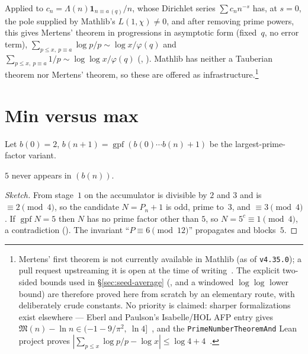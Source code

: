 \documentclass[10pt,a4paper]{article}
\newcommand{\gpf}{\operatorname{gpf}}
\begin{document}
Applied to $c_n=\Lambda(n)\mathbf 1_{n\equiv a\,(q)}/n$, whose Dirichlet series
$\sum c_n n^{-s}$ has, at $s=0$, the pole supplied by Mathlib's
$L(1,\chi)\ne0$, and after removing prime powers, this gives Mertens'
theorem in progressions in asymptotic form (fixed~$q$, no error term),
$\sum_{p\le x,\ p\equiv a}\log p/p\sim\log x/\varphi(q)$ and
$\sum_{p\le x,\ p\equiv a}1/p\sim\log\log x/\varphi(q)$
(,
).  Mathlib has
neither a Tauberian theorem nor Mertens' theorem, so these are offered as
infrastructure.\footnote{Mertens' first theorem is not currently available
in Mathlib (as of \texttt{v4.35.0}); a pull request upstreaming it is open
at the time of writing~\cite{Mathlib41394}.  The explicit two-sided bounds
used in \S\ref{sec:seed-average}
(, and a windowed
$\log\log$ lower bound) are therefore proved here from scratch by an
elementary route, with deliberately crude constants.  No priority is
claimed: sharper formalizations exist elsewhere --- Eberl and Paulson's
Isabelle/HOL AFP entry gives
$\mathfrak{M}(n)-\ln n\in(-1-9/\pi^2,\ \ln4]$~\cite{EberlPaulsonPNT}, and the
\texttt{PrimeNumberTheoremAnd} Lean project proves
$|\sum_{p\le x}\log p/p-\log x|\le\log4+4$~\cite{PNTplus}.}

\section{Min versus max}
\label{sec:minmax}

Let $b(0)=2$, $b(n{+}1)=\gpf(b(0)\cdots b(n)+1)$ be the largest-prime-factor
variant.

\begin{theorem}
$5$ never appears in $(b(n))$.
\end{theorem}

\begin{proof}[Sketch]
From stage~$1$ on the accumulator is divisible by $2$ and $3$ and is
$\equiv2\pmod4$, so the candidate $N=P_n+1$ is odd, prime to~$3$, and
$\equiv3\pmod4$.  If $\gpf N=5$ then $N$ has no prime factor other than
$5$, so $N=5^c\equiv1\pmod4$, a contradiction
().
The invariant ``$P\equiv6\pmod{12}$'' propagates and blocks~$5$.
\end{proof}
\end{document}

